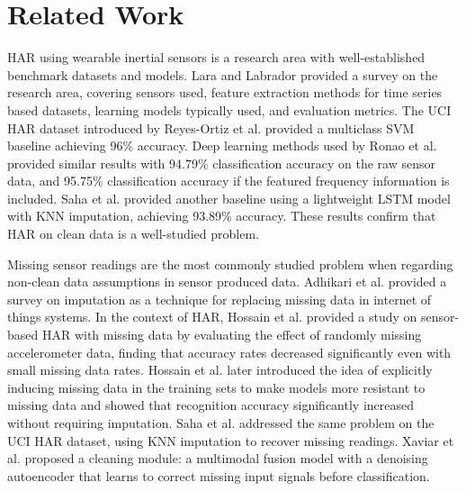 \section{Related Work}


HAR using wearable inertial sensors is a research area with well-established benchmark datasets
and models. Lara and Labrador \cite{lara-2013} provided a survey on the research area, covering
sensors used, feature extraction methods for time series based datasets, learning models typically
used, and evaluation metrics. The UCI HAR dataset \cite{reyes-ortiz-2013} introduced by Reyes-Ortiz
et al. \cite{reyes-ortiz-2013} provided a multiclass SVM baseline achieving 96\% accuracy. Deep
learning methods used by Ronao et al. \cite{ronao-2016} provided similar results with 94.79\%
classification accuracy on the raw sensor data, and 95.75\% classification accuracy if the featured
frequency information is included. Saha et al. \cite{saha-2025} provided another baseline using
a lightweight LSTM model with KNN imputation, achieving 93.89\% accuracy. These results confirm
that HAR on clean data is a well-studied problem.

Missing sensor readings are the most commonly studied problem when regarding non-clean data
assumptions in sensor produced data. Adhikari et al. \cite{adhikari-2022} provided a
survey on imputation as a technique for replacing missing data in internet of things systems.
In the context of HAR, Hossain et al. \cite{hossain-2018} provided a study on sensor-based HAR with
missing data by evaluating the effect of randomly missing accelerometer data, finding that accuracy
rates decreased significantly even with small missing data rates. Hossain et al. \cite{hossain-2020}
later introduced the idea of explicitly inducing missing data in the training sets to make models
more resistant to missing data and showed that recognition accuracy significantly increased without
requiring imputation. Saha et al. \cite{saha-2025} addressed the same problem on the UCI HAR
dataset, using KNN imputation to recover missing readings. Xaviar et al. \cite{xaviar-2023}
proposed a cleaning module: a multimodal fusion model with a denoising autoencoder that learns to
correct missing input signals before classification.

